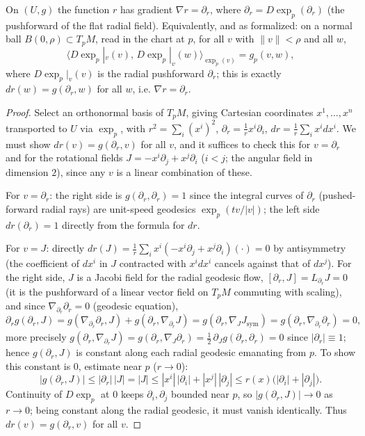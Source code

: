 \begin{lemma}
  \label{lem:pet-ch5-gauss-lemma}
  \leanok
  On $(U,g)$ the function $r$ has gradient $\nabla r=\partial_r$, where
  $\partial_r=D\exp_p(\partial_r)$ (the pushforward of the flat radial field).
  Equivalently, and as formalized: on a normal ball $B(0,\rho)\subset T_pM$,
  read in the chart at $p$, for all $v$ with $\|v\|<\rho$ and all $w$,
  \[
    \big\langle D\exp_p|_v(v),\,D\exp_p|_v(w)\big\rangle_{\exp_p(v)}=g_p(v,w),
  \]
  where $D\exp_p|_v(v)$ is the radial pushforward $\partial_r$; this is exactly
  $dr(w)=g(\partial_r,w)$ for all $w$, i.e. $\nabla r=\partial_r$.
\end{lemma}
\begin{proof}
  \leanok
  Select an orthonormal basis of $T_pM$, giving Cartesian coordinates $x^1,\dots,x^n$
  transported to $U$ via $\exp_p$, with $r^2=\sum_i(x^i)^2$,
  $\partial_r=\tfrac1rx^i\partial_i$, $dr=\tfrac1r\sum_ix^idx^i$. We must show
  $dr(v)=g(\partial_r,v)$ for all $v$, and it suffices to check this for $v=\partial_r$
  and for the rotational fields $J=-x^i\partial_j+x^j\partial_i$ ($i<j$; the angular
  field in dimension $2$), since any $v$ is a linear combination of these.

  For $v=\partial_r$: the right side is $g(\partial_r,\partial_r)=1$ since the integral
  curves of $\partial_r$ (pushed-forward radial rays) are unit-speed geodesics
  $\exp_p(tv/|v|)$; the left side $dr(\partial_r)=1$ directly from the formula for
  $dr$.

  For $v=J$: directly $dr(J)=\tfrac1r\sum_ix^i(-x^i\partial_j+x^j\partial_i)(\cdot)=0$
  by antisymmetry (the coefficient of $dx^i$ in $J$ contracted with $x^i dx^i$
  cancels against that of $dx^j$). For the right side, $J$ is a Jacobi field for the
  radial geodesic flow, $[\partial_r,J]=L_{\partial_r}J=0$ (it is the pushforward of a
  linear vector field on $T_pM$ commuting with scaling), and since $\nabla_{\partial_r}
  \partial_r=0$ (geodesic equation),
  \[
    \partial_rg(\partial_r,J)=g(\nabla_{\partial_r}\partial_r,J)+g(\partial_r,\nabla_{\partial_r}J)
    =g(\partial_r,\nabla_JJ_{\text{sym}})=g(\partial_r,\nabla_{\partial_r}\partial_r)_{{}}=0,
  \]
  more precisely $g(\partial_r,\nabla_{\partial_r}J)=g(\partial_r,\nabla_J\partial_r)=
  \tfrac12\,\partial_Jg(\partial_r,\partial_r)=0$ since $|\partial_r|\equiv1$; hence
  $g(\partial_r,J)$ is constant along each radial geodesic emanating from $p$. To show
  this constant is $0$, estimate near $p$ ($r\to0$):
  \[
    |g(\partial_r,J)|\le|\partial_r|\,|J|=|J|\le|x^i|\,|\partial_i|+|x^j|\,|\partial_j|
    \le r(x)\big(|\partial_i|+|\partial_j|\big).
  \]
  Continuity of $D\exp_p$ at $0$ keeps $\partial_i,\partial_j$ bounded near $p$, so
  $|g(\partial_r,J)|\to0$ as $r\to0$; being constant along the radial geodesic, it
  must vanish identically. Thus $dr(v)=g(\partial_r,v)$ for all $v$.
\end{proof}
